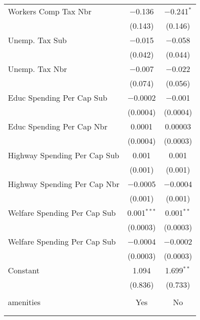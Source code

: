\begin{table}[!htbp]
\begin{tabular}{@{\extracolsep{5pt}}lcc}
  Workers Comp Tax Nbr & $-$0.136 & $-$0.241$^{*}$ \\ 
  & (0.143) & (0.146) \\ 
  Unemp. Tax Sub & $-$0.015 & $-$0.058 \\ 
  & (0.042) & (0.044) \\ 
  Unemp. Tax Nbr & $-$0.007 & $-$0.022 \\ 
  & (0.074) & (0.056) \\ 
  Educ Spending Per Cap Sub & $-$0.0002 & $-$0.001 \\ 
  & (0.0004) & (0.0004) \\ 
  Educ Spending Per Cap Nbr & 0.0001 & 0.00003 \\ 
  & (0.0004) & (0.0003) \\ 
  Highway Spending Per Cap Sub & 0.001 & 0.001 \\ 
  & (0.001) & (0.001) \\ 
  Highway Spending Per Cap Nbr & $-$0.0005 & $-$0.0004 \\ 
  & (0.001) & (0.001) \\ 
  Welfare Spending Per Cap Sub & 0.001$^{***}$ & 0.001$^{**}$ \\ 
  & (0.0003) & (0.0003) \\ 
  Welfare Spending Per Cap Sub & $-$0.0004 & $-$0.0002 \\ 
  & (0.0003) & (0.0003) \\ 
  Constant & 1.094 & 1.699$^{**}$ \\ 
  & (0.836) & (0.733) \\ 
 \hline \\[-1.8ex] 
amenities & Yes & No \\ 
\hline \\[-1.8ex] 
\hline 
\hline \\[-1.8ex] 
\end{tabular} 
\end{table} 
